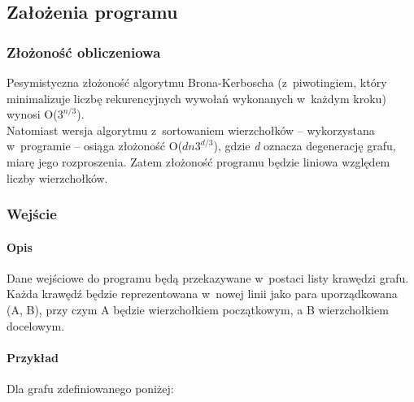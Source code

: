 \documentclass[11pt,a4paper]{article}
\begin{document}
\subsection{Założenia programu}
\subsubsection{Złożoność obliczeniowa}
Pesymistyczna złożoność algorytmu Brona-Kerboscha (z~piwotingiem, który minimalizuje liczbę rekurencyjnych wywołań wykonanych w~każdym kroku) wynosi O($3^{n/3}$).\\

Natomiast wersja algorytmu z~sortowaniem wierzchołków -- wykorzystana w~programie -- osiąga złożoność O($dn3^{d/3}$), gdzie \textit{d} oznacza degenerację grafu, miarę jego rozproszenia. Zatem złożoność programu będzie liniowa względem liczby wierzchołków.

\subsubsection{Wejście}
\paragraph{Opis} Dane wejściowe do programu będą przekazywane w~postaci listy krawędzi grafu. Każda krawędź będzie reprezentowana w~nowej linii jako para uporządkowana (A, B), przy czym A będzie wierzchołkiem początkowym, a B wierzchołkiem docelowym.
\paragraph{Przykład} Dla grafu zdefiniowanego poniżej:\\

\end{document}
